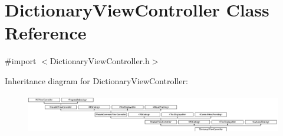 \hypertarget{interface_dictionary_view_controller}{\section{Dictionary\-View\-Controller Class Reference}
\label{interface_dictionary_view_controller}
}


{\ttfamily \#import $<$Dictionary\-View\-Controller.\-h$>$}

Inheritance diagram for Dictionary\-View\-Controller\-:\begin{figure}[H]
\begin{center}
\leavevmode
\includegraphics[height=1.750000cm]{interface_dictionary_view_controller}
\end{center}
\end{figure}
